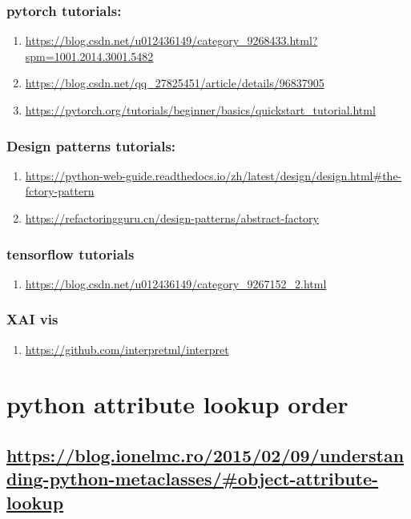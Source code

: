 \documentclass[11pt]{article}
\begin{document}
\subsubsection{pytorch tutorials:}
\label{sec:org823b195}
\begin{enumerate}
\item \url{https://blog.csdn.net/u012436149/category\_9268433.html?spm=1001.2014.3001.5482}
\label{sec:org5619392}
\item \url{https://blog.csdn.net/qq\_27825451/article/details/96837905}
\label{sec:org28fad2a}
\item \url{https://pytorch.org/tutorials/beginner/basics/quickstart\_tutorial.html}
\label{sec:org7d6ccdc}
\end{enumerate}
\subsubsection{Design patterns tutorials:}
\label{sec:orgcf6ef17}
\begin{enumerate}
\item \url{https://python-web-guide.readthedocs.io/zh/latest/design/design.html\#the-fctory-pattern}
\label{sec:orgc61368c}
\item \url{https://refactoringguru.cn/design-patterns/abstract-factory}
\label{sec:org0968094}
\end{enumerate}
\subsubsection{tensorflow tutorials}
\label{sec:org5b973ad}
\begin{enumerate}
\item \url{https://blog.csdn.net/u012436149/category\_9267152\_2.html}
\label{sec:org245b02d}
\end{enumerate}
\subsubsection{XAI vis}
\label{sec:org7a41421}
\begin{enumerate}
\item \url{https://github.com/interpretml/interpret}
\label{sec:orgc6b7748}
\end{enumerate}
\section{python attribute lookup order}
\label{sec:org33136f8}
\subsection{\url{https://blog.ionelmc.ro/2015/02/09/understanding-python-metaclasses/\#object-attribute-lookup}}
\label{sec:orgb77c95a}
\subsection{}
\label{sec:org89a499d}
\end{document}
